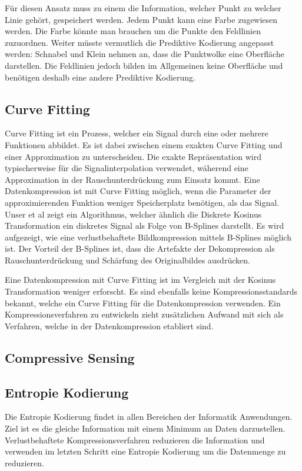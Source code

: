 Für diesen Ansatz muss zu einem die Information, welcher Punkt zu welcher Linie gehört, gespeichert werden. Jedem Punkt kann eine Farbe zugewiesen werden. Die Farbe könnte man brauchen um die Punkte den Feldlinien zuzuordnen. Weiter müsste vermutlich die Prediktive Kodierung angepasst werden: Schnabel und Klein nehmen an, dass die Punktwolke eine Oberfläche darstellen. Die Feldlinien jedoch bilden im Allgemeinen keine Oberfläche und benötigen deshalb eine andere Prediktive Kodierung.

\subsection{Curve Fitting}
Curve Fitting ist ein Prozess, welcher ein Signal durch eine oder mehrere Funktionen abbildet. Es ist dabei zwischen einem exakten Curve Fitting und einer Approximation zu unterscheiden. Die exakte Repräsentation wird typischerweise für die Signalinterpolation verwendet, wäherend eine Approximation in der Rauschunterdrückung zum Einsatz kommt. Eine Datenkompression ist mit Curve Fitting möglich, wenn die Parameter der approximierenden Funktion weniger Speicherplatz benötigen, als das Signal.\\
Unser et al \cite{unser1993b:spline} zeigt ein Algorithmus, welcher ähnlich die Diskrete Kosinus Transformation ein diskretes Signal als Folge von B-Splines darstellt. Es wird aufgezeigt, wie eine verlustbehaftete Bildkompression mittels B-Splines möglich ist. Der Vorteil der B-Splines ist, dass die Artefakte der Dekompression als Rauschunterdrückung und Schärfung des Originalbildes ausdrücken.

Eine Datenkompression mit Curve Fitting ist im Vergleich mit der Kosinus Transformation weniger erforscht. Es sind ebenfalls keine Kompressionsstandards bekannt, welche ein Curve Fitting für die Datenkompression verwenden. Ein Kompressionsverfahren zu entwickeln zieht zusätzlichen Aufwand mit sich als Verfahren, welche in der Datenkompression etabliert sind.

\subsection{Compressive Sensing}


\subsection{Entropie Kodierung}
Die Entropie Kodierung findet in allen Bereichen der Informatik Anwendungen. Ziel ist es die gleiche Information mit einem Minimum an Daten darzustellen. Verlustbehaftete Kompressionsverfahren reduzieren die Information und verwenden im letzten Schritt eine Entropie Kodierung um die Datenmenge zu reduzieren.

